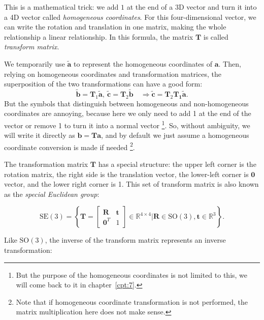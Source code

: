 This is a mathematical trick: we add $ 1 $ at the end of a 3D vector and turn it into a 4D vector called \textit{homogeneous coordinates}. For this four-dimensional vector, we can write the rotation and translation in one matrix, making the whole relationship a linear relationship. In this formula, the matrix $ \mathbf {T} $ is called \textit{transform matrix}.

We temporarily use $  \tilde { \mathbf {a} } $ to represent the homogeneous coordinates of $ \mathbf {a} $. Then, relying on homogeneous coordinates and transformation matrices, the superposition of the two transformations can have a good form:
\begin{equation}
\tilde{\mathbf{b}} = \mathbf{T}_1 \tilde{\mathbf{a}}, \  \tilde{\mathbf{c}} = \mathbf{T}_2 \tilde{\mathbf{b}} \quad \Rightarrow \tilde{\mathbf{c}} = \mathbf{T}_2 \mathbf{T_1} \tilde{\mathbf{a}}.
\end{equation}
But the symbols that distinguish between homogeneous and non-homogeneous coordinates are annoying, because here we only need to add 1 at the end of the vector or remove 1 to turn it into a normal vector \footnote {But the purpose of the homogeneous coordinates is not limited to this, we will come back to it in chapter~\ref{cpt:7}.}. So, without ambiguity, we will write it directly as $ \mathbf {b}= \mathbf {T} \mathbf {a} $, and by default we just assume a homogeneous coordinate conversion is made if needed \footnote { Note that if homogeneous coordinate transformation is not performed, the matrix multiplication here does not make sense. }.

The transformation matrix $\mathbf{T}$ has a special structure: the upper left corner is the rotation matrix, the right side is the translation vector, the lower-left corner is $ \mathbf{0} $ vector, and the lower right corner is 1. This set of transform matrix is also known as the \textit{special Euclidean group}:

\begin{equation}
\mathrm{SE}(3) = \left\{ \mathbf{T} = \left[ {\begin{array}{*{20}{c}}
    \mathbf{R} & \mathbf{t} \\
    {{\mathbf{0}^T}} & 1
    \end{array}} \right]
\in \mathbb{R}^{4 \times 4} | \mathbf{R} \in \mathrm{SO}(3), \mathbf{t} \in \mathbb{R}^3\right\} .
\end{equation}

Like $ \mathrm{SO}( 3 ) $, the inverse of the transform matrix represents an inverse transformation:

